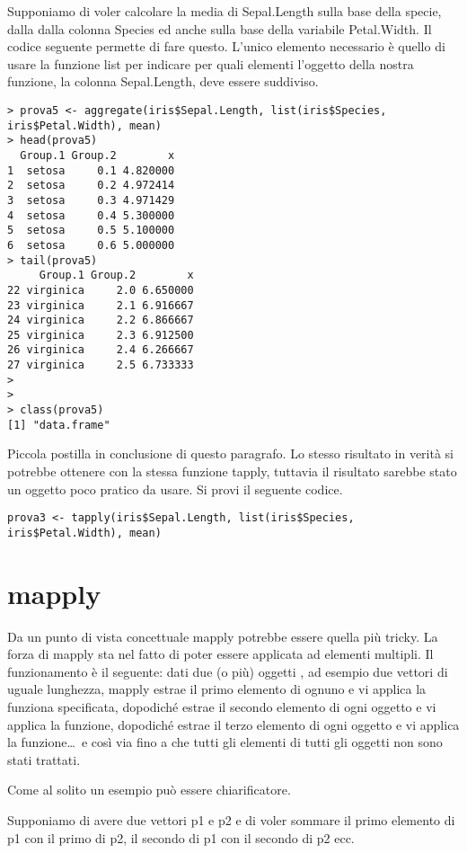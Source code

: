 Supponiamo di voler calcolare la media di Sepal.Length sulla base della specie, dalla dalla colonna Species ed anche sulla base della variabile Petal.Width. Il codice seguente permette di fare questo. L'unico elemento necessario è quello di usare la funzione list per indicare per quali elementi l'oggetto della nostra funzione, la colonna Sepal.Length, deve essere suddiviso.
\begin{lstlisting}	
> prova5 <- aggregate(iris$Sepal.Length, list(iris$Species, iris$Petal.Width), mean)
> head(prova5)
  Group.1 Group.2        x
1  setosa     0.1 4.820000
2  setosa     0.2 4.972414
3  setosa     0.3 4.971429
4  setosa     0.4 5.300000
5  setosa     0.5 5.100000
6  setosa     0.6 5.000000
> tail(prova5)
     Group.1 Group.2        x
22 virginica     2.0 6.650000
23 virginica     2.1 6.916667
24 virginica     2.2 6.866667
25 virginica     2.3 6.912500
26 virginica     2.4 6.266667
27 virginica     2.5 6.733333
>
>
> class(prova5)
[1] "data.frame"
\end{lstlisting}

Piccola postilla in conclusione di questo paragrafo. Lo stesso risultato in verità si potrebbe ottenere con la stessa funzione tapply, tuttavia il risultato sarebbe stato un oggetto poco pratico da usare. Si provi il seguente codice.
\begin{lstlisting}	
prova3 <- tapply(iris$Sepal.Length, list(iris$Species, iris$Petal.Width), mean)
\end{lstlisting}

\section{mapply}

Da un punto di vista concettuale \textsf{mapply} potrebbe essere quella più tricky. La forza di \textsf{mapply} sta nel fatto di poter essere applicata ad elementi multipli. Il funzionamento è il seguente: dati due (o più) oggetti \erre, ad esempio due vettori di uguale lunghezza, \textsf{mapply} estrae il primo elemento di ognuno e vi applica la funziona specificata, dopodiché estrae il secondo elemento di ogni oggetto e vi applica la funzione, dopodiché estrae il terzo elemento di ogni oggetto e vi applica la funzione\dots\ e così via fino a che tutti gli elementi di tutti gli oggetti non sono stati trattati.

Come al solito un esempio può essere chiarificatore.

Supponiamo di avere due vettori p1 e p2 e di voler sommare il primo elemento di p1 con il primo di p2, il secondo di p1 con il secondo di p2 ecc.

